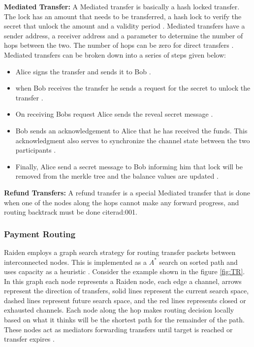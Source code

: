 \textbf{Mediated Transfer:} A Mediated transfer is basically a hash locked transfer. The lock has an amount that needs to be transferred, a hash lock to verify the secret that unlock the amount and a validity period \cite{rad:001}. Mediated transfers have a sender address, a receiver address and a parameter to determine the number of hops between the two. The number of hops can be zero for direct transfers \cite{rad:001}. Mediated transfers can be broken down into a series of steps given below:
\begin{itemize}

\item Alice signs the transfer and sends it to Bob \cite{rad:001}.
\item when Bob receives the transfer he sends a request for the secret to unlock the transfer \cite{rad:001}.
\item On receiving Bobs request Alice sends the reveal secret message \cite{rad:001}.
\item Bob sends an acknowledgement to Alice that he has received the funds. This acknowledgment also serves to synchronize the channel state between the two participants \cite{rad:001}.
\item Finally, Alice send a secret message to Bob informing him that lock will be removed from the merkle tree and the balance values are updated \cite{rad:001}. 
\end{itemize}

\textbf{Refund Transfers:} A refund transfer is a special Mediated transfer that is done when one of the nodes along the hops cannot make any forward progress, and routing backtrack must be done cite{rad:001}.  
\vspace{0.5cm}	
\subsubsection{Payment Routing} \label{NP}	
Raiden employs a graph search strategy for routing transfer packets between interconnected nodes. This is implemented as a $A^*$ search on sorted path and uses capacity as a heuristic \cite{rad:001}.  Consider the example shown in the figure \ref{fig:TR}. In this graph each node represents a Raiden node, each edge a channel, arrows represent the direction of transfers, solid lines represent the current search space, dashed lines represent future search space, and the red lines represents closed or exhausted channels. Each node along the hop makes routing decision locally based on what it thinks will be the shortest path for the remainder of the path. These nodes act as mediators forwarding transfers until target is reached or transfer expires \cite{rad:001}.

